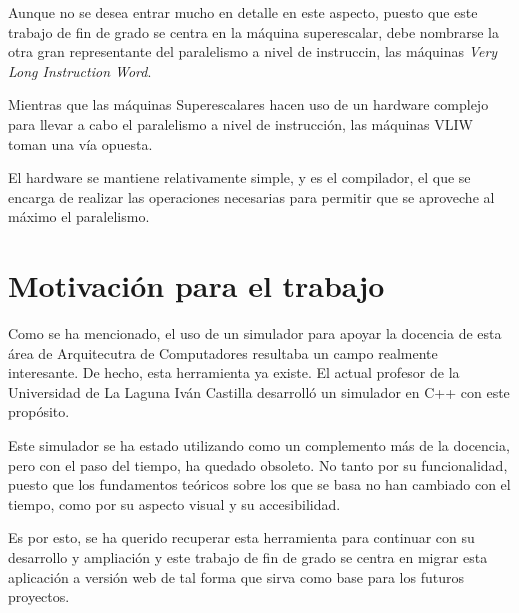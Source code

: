 Aunque no se desea entrar mucho en detalle en este aspecto, puesto que este trabajo de 
fin de grado se centra en la máquina superescalar, debe nombrarse la otra gran 
representante del paralelismo a nivel de instruccin, las máquinas \textit{Very Long Instruction Word}.

\bigskip
Mientras que las máquinas Superescalares hacen uso de un hardware complejo para llevar
a cabo el paralelismo a nivel de instrucción, las máquinas VLIW toman una vía opuesta.

\bigskip
El hardware se mantiene relativamente simple, y es el compilador, el que se encarga
de realizar las operaciones necesarias para permitir que se aproveche al máximo el 
paralelismo.

\section{Motivación para el trabajo}
\label{1:sec:3}

Como se ha mencionado, el uso de un simulador para apoyar la docencia de esta área
de Arquitecutra de Computadores resultaba un campo realmente interesante. De hecho,
esta herramienta ya existe. El actual profesor de la Universidad de La Laguna 
Iván Castilla desarrolló un simulador en C++ con este propósito.

\bigskip
Este simulador se ha estado utilizando como un complemento más de la docencia, pero
con el paso del tiempo, ha quedado obsoleto. No tanto por su funcionalidad, puesto
que los fundamentos teóricos sobre los que se basa no han cambiado con el tiempo, como 
por su aspecto visual y su accesibilidad.

\bigskip
Es por esto, se ha querido recuperar esta herramienta para continuar con su desarrollo 
y ampliación y este trabajo de fin de grado se centra en migrar esta aplicación a versión 
web de tal forma que sirva como base para los futuros proyectos.

